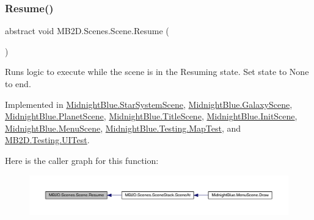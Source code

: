 \subsubsection{\texorpdfstring{Resume()}{Resume()}}
{\footnotesize\ttfamily abstract void M\+B2\+D.\+Scenes.\+Scene.\+Resume (\begin{DoxyParamCaption}{ }\end{DoxyParamCaption})\hspace{0.3cm}{\ttfamily [pure virtual]}}



Runs logic to execute while the scene is in the Resuming state. Set state to None to end. 



Implemented in \hyperlink{class_midnight_blue_1_1_star_system_scene_aefbf0750a7ce153b923bcabb132e4875}{Midnight\+Blue.\+Star\+System\+Scene}, \hyperlink{class_midnight_blue_1_1_galaxy_scene_ab641e6727cdb64dc6487e9a229521692}{Midnight\+Blue.\+Galaxy\+Scene}, \hyperlink{class_midnight_blue_1_1_planet_scene_aa14750d3675b59462796e821b3921397}{Midnight\+Blue.\+Planet\+Scene}, \hyperlink{class_midnight_blue_1_1_title_scene_afb0bb3ad8b2766b5d57537dc1ef22249}{Midnight\+Blue.\+Title\+Scene}, \hyperlink{class_midnight_blue_1_1_init_scene_a01ade76252a492d20181bd2e00eb217f}{Midnight\+Blue.\+Init\+Scene}, \hyperlink{class_midnight_blue_1_1_menu_scene_a76f8bd3add4abf16ac9962a2fb51fad2}{Midnight\+Blue.\+Menu\+Scene}, \hyperlink{class_midnight_blue_1_1_testing_1_1_map_test_aa595402e6d3702119877721f7cb3ab9f}{Midnight\+Blue.\+Testing.\+Map\+Test}, and \hyperlink{class_m_b2_d_1_1_testing_1_1_u_i_test_a933c2bf347db47bf2921709c10d78acc}{M\+B2\+D.\+Testing.\+U\+I\+Test}.

Here is the caller graph for this function\+:\nopagebreak
\begin{figure}[H]
\begin{center}
\leavevmode
\includegraphics[width=350pt]{class_m_b2_d_1_1_scenes_1_1_scene_ad13639db22b059a1b714eefd9d927735_icgraph}
\end{center}
\end{figure}
\hypertarget{class_m_b2_d_1_1_scenes_1_1_scene_a779de7c1ab23b698dcde3a228324a991}{}\label{class_m_b2_d_1_1_scenes_1_1_scene_a779de7c1ab23b698dcde3a228324a991} 
